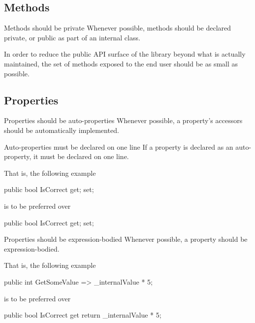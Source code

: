 \documentclass[11pt,a4paper]{article}
\begin{document}
\subsection{Methods}
\begin{should}{Methods should be private}
Whenever possible, methods should be declared private, or public as part of an internal class.
\end{should}

In order to reduce the public API surface of the library beyond what is actually maintained, the set of methods exposed to the end user should be as small as possible.

\subsection{Properties}
\begin{should}{Properties should be auto-properties}
Whenever possible, a property's accessors should be automatically implemented.
\end{should}

\begin{must}{Auto-properties must be declared on one line}
If a property is declared as an auto-property, it must be declared on one line.
\end{must}

That is, the following example 
\begin{code}
public bool IsCorrect { get; set; }
\end{code}

is to be preferred over

\begin{code}
public bool IsCorrect 
{
    get; 
    set; 
}
\end{code}

\begin{should}{Properties should be expression-bodied}
Whenever possible, a property should be expression-bodied.
\end{should}

That is, the following example 
\begin{code}
public int GetSomeValue => _internalValue * 5;
\end{code}

is to be preferred over

\begin{code}
public bool IsCorrect 
{
    get
    {
        return _internalValue * 5;
    }
}
\end{code}
\end{document}
